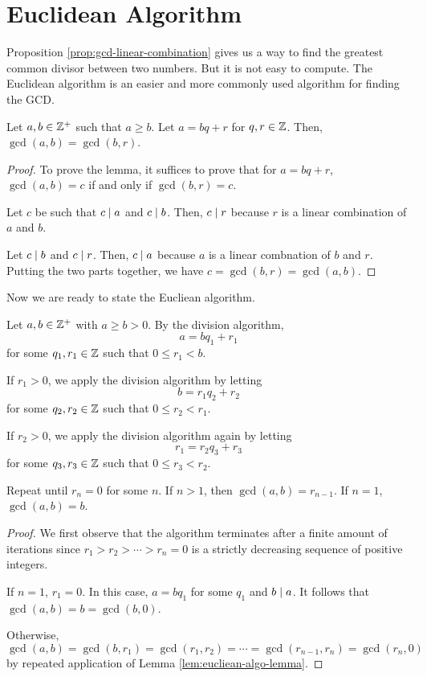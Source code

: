 \section{Euclidean Algorithm}

Proposition \ref{prop:gcd-linear-combination} gives us a way to find the greatest common divisor between two numbers. But it is not easy to compute. The Euclidean algorithm is an easier and more commonly used algorithm for finding the GCD.

\begin{lemma} \label{lem:eucliean-algo-lemma}
    Let $a,b \in \mathbb{Z}^+$ such that $a \geq b$. Let $a = bq + r$ for $q,r \in \mathbb{Z}$. Then, $\gcd(a,b) = \gcd(b,r)$.
\end{lemma}

\begin{proof}
    To prove the lemma, it suffices to prove that for $a = bq + r$, $\gcd(a,b) = c$ if and only if $\gcd(b,r)= c$.

    Let $c$ be such that $c \mathrel{\mid} a$ and $c \mathrel{\mid} b$. Then, $c \mathrel{\mid} r$ because $r$ is a linear combination of $a$ and $b$.

    Let $c \mathrel{\mid} b$ and $c \mathrel{\mid} r$. Then, $c \mathrel{\mid} a$ because $a$ is a linear combnation of $b$ and $r$. Putting the two parts together, we have $c = \gcd(b,r) = \gcd(a,b)$.
\end{proof}

Now we are ready to state the Eucliean algorithm.

\begin{theorem}
    Let $a,b \in \mathbb{Z}^+$ with $a \geq b > 0$. By the division algorithm, 
    $$
    a = bq_1 + r_1
    $$
    for some $q_1,r_1 \in \mathbb{Z}$ such that $0 \leq r_1 < b$. 
    
    If $r_1 > 0$, we apply the division algorithm by letting
    $$
    b = r_1 q_2 + r_2
    $$
    for some $q_2,r_2 \in \mathbb{Z}$ such that $0 \leq r_2 < r_1$.

    If $r_2 > 0$, we apply the division algorithm again by letting
    $$
    r_1 = r_2q_3 + r_3
    $$
    for some $q_3,r_3 \in \mathbb{Z}$ such that $0 \leq r_3 < r_2$.

    Repeat until $r_n = 0$ for some $n$. If $n > 1$, then $\gcd(a,b) = r_{n-1}$. If $n=1$, $\gcd(a,b) = b$.
\end{theorem}

\begin{proof}
    We first observe that the algorithm terminates after a finite amount of iterations since $r_1 > r_2 > \cdots > r_n = 0$ is a strictly decreasing sequence of positive integers.

    If $n = 1$, $r_1 = 0$. In this case, $a = bq_1$ for some $q_1$ and $b \mathrel{\mid} a$. It follows that $\gcd(a,b) = b = \gcd(b,0)$.

    Otherwise,
    $$
    \gcd(a,b) = \gcd(b,r_1) = \gcd(r_1,r_2) = \cdots = \gcd(r_{n-1}, r_n) = \gcd(r_{n},0)
    $$
    by repeated application of Lemma \ref{lem:eucliean-algo-lemma}.
\end{proof}

